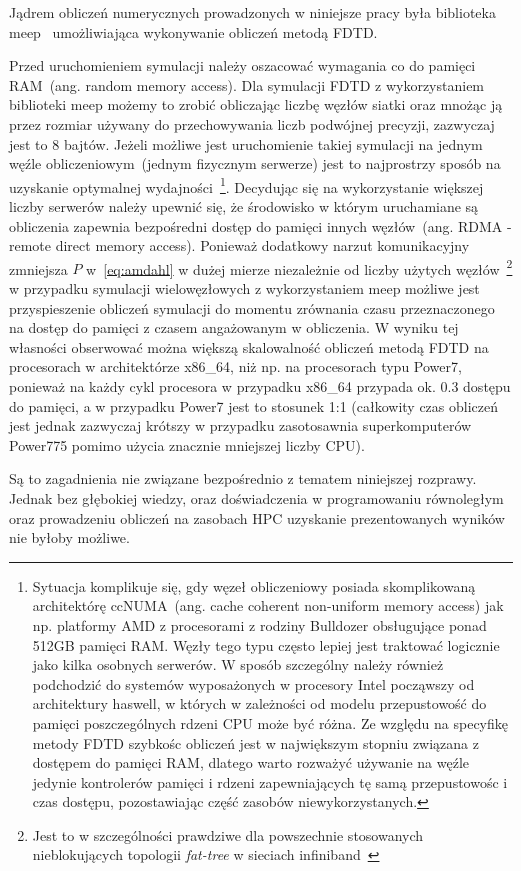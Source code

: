 Jądrem obliczeń numerycznych prowadzonych w niniejsze pracy była biblioteka meep~\cite{OskooiRo10} umożliwiająca wykonywanie obliczeń metodą FDTD.

Przed uruchomieniem symulacji należy oszacować wymagania co do pamięci RAM~(ang. random memory access). Dla symulacji FDTD z wykorzystaniem biblioteki meep możemy to zrobić obliczając liczbę węzłów siatki oraz mnożąc ją przez rozmiar używany do przechowywania liczb podwójnej precyzji, zazwyczaj jest to 8 bajtów. Jeżeli możliwe jest uruchomienie takiej symulacji na jednym węźle obliczeniowym~(jednym fizycznym serwerze) jest to najprostrzy sposób na uzyskanie optymalnej wydajności~\footnote{Sytuacja komplikuje się, gdy węzeł obliczeniowy posiada skomplikowaną architektórę ccNUMA~(ang. cache coherent non-uniform memory access) jak np. platformy AMD z procesorami z rodziny Bulldozer obsługujące ponad 512GB pamięci RAM. Węzły tego typu często lepiej jest traktować logicznie jako kilka osobnych serwerów. W sposób szczególny należy również podchodzić do systemów wyposażonych w procesory Intel począwszy od architektury haswell, w których w zależności od modelu przepustowość do pamięci poszczególnych rdzeni CPU może być różna. Ze względu na specyfikę metody FDTD szybkośc obliczeń jest w największym stopniu związana z dostępem do pamięci RAM, dlatego warto rozważyć używanie na węźle jedynie kontrolerów pamięci i rdzeni zapewniających tę samą przepustowośc i czas dostępu, pozostawiając część zasobów niewykorzystanych.}. Decydując się na wykorzystanie większej liczby serwerów należy upewnić się, że środowisko w którym uruchamiane są obliczenia zapewnia bezpośredni dostęp do pamięci innych węzłów~(ang. RDMA - remote direct memory access). Ponieważ dodatkowy narzut komunikacyjny zmniejsza $P$ w~\ref{eq:amdahl} w dużej mierze niezależnie od liczby użytych węzłów~\footnote{Jest to w szczególności prawdziwe dla powszechnie stosowanych nieblokujących topologii \textit{fat-tree} w sieciach infiniband~\cite{zahavi2010optimized}} w przypadku symulacji wielowęzłowych z wykorzystaniem meep możliwe jest przyspieszenie obliczeń symulacji do momentu zrównania czasu przeznaczonego na dostęp do pamięci z czasem angażowanym w obliczenia. W wyniku tej własności obserwować można większą skalowalność obliczeń metodą FDTD na procesorach w architektórze x86\_64, niż np. na procesorach typu Power7, ponieważ na każdy cykl procesora w przypadku x86\_64 przypada ok. 0.3 dostępu do pamięci, a w przypadku Power7 jest to stosunek 1:1 (całkowity czas obliczeń jest jednak zazwyczaj krótszy w przypadku zasotosawnia superkomputerów Power775 pomimo użycia znacznie mniejszej liczby CPU).

Są to zagadnienia nie związane bezpośrednio z tematem niniejszej rozprawy. Jednak bez głębokiej wiedzy, oraz doświadczenia w programowaniu równoległym oraz prowadzeniu obliczeń na zasobach HPC uzyskanie prezentowanych wyników nie byłoby możliwe.
